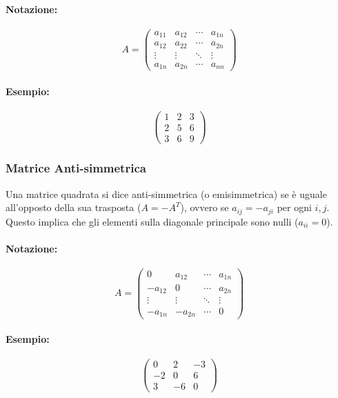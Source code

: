 \documentclass{article}
\begin{document}
\paragraph{Notazione:}
\[ A = \begin{pmatrix}
a_{11} & a_{12} & \cdots & a_{1n} \\
a_{12} & a_{22} & \cdots & a_{2n} \\
\vdots & \vdots & \ddots & \vdots \\
a_{1n} & a_{2n} & \cdots & a_{nn}
\end{pmatrix} \]
\paragraph{Esempio:}
\[ \begin{pmatrix}
1 & 2 & 3 \\
2 & 5 & 6 \\
3 & 6 & 9
\end{pmatrix} \]

\subsubsection*{Matrice Anti-simmetrica}
Una matrice quadrata si dice anti-simmetrica (o emisimmetrica) se è uguale all'opposto della sua trasposta ($A = -A^T$), ovvero se $a_{ij} = -a_{ji}$ per ogni $i,j$. Questo implica che gli elementi sulla diagonale principale sono nulli ($a_{ii} = 0$).
\paragraph{Notazione:}
\[ A = \begin{pmatrix}
0 & a_{12} & \cdots & a_{1n} \\
-a_{12} & 0 & \cdots & a_{2n} \\
\vdots & \vdots & \ddots & \vdots \\
-a_{1n} & -a_{2n} & \cdots & 0
\end{pmatrix} \]
\paragraph{Esempio:}
\[ \begin{pmatrix}
0 & 2 & -3 \\
-2 & 0 & 6 \\
3 & -6 & 0
\end{pmatrix} \]
\end{document}
